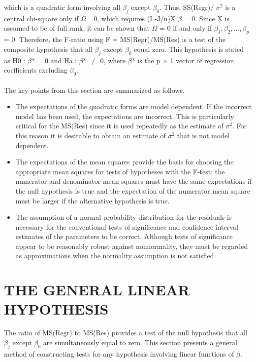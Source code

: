 \documentclass[letterpaper,11pt]{article}
\begin{document}
{which is a quadratic form involving all $\beta_{j}$ except $\beta_{0}$. Thus, SS(Regr)/ $\sigma^{2}$ is a central chi-square only if $\Omega$= 0, which requires (I -J/n)X $\beta$ = 0. Since X is assumed to be of full rank, it can be shown that $\Omega$ = 0 if and only if
$\beta_{1}, \beta_{2}, ..., \beta_{p}$ = 0. Therefore, the F-ratio using F = MS(Regr)/MS(Res) is a test of the composite hypothesis that all $\beta_{j}$ except $\beta_{0}$ equal zero. This hypothesis is stated as H0 : $\beta$* = 0 and Ha : $\beta$* $\neq$ 0,
where $\beta$* is the p $\times$ 1 vector of regression coefficients excluding $\beta_{0}$.
\\ \\
The key points from this section are summarized as follows.
\begin{itemize}
\item The expectations of the quadratic forms are model dependent. If the incorrect model has been used, the expectations are incorrect. This is particularly critical for the MS(Res) since it is used repeatedly as the estimate of $\sigma^{2}$.
For this reason it is desirable to obtain an estimate of $\sigma^{2}$ that is not model dependent. 
\item The expectations of the mean squares provide the basis for choosing the appropriate mean squares for tests of hypotheses
with the F-test; the numerator and denominator mean squares must have the same expectations if the null
hypothesis is true and the expectation of the numerator mean square must be larger if the alternative hypothesis
is true.
\item The assumption of a normal probability distribution for the residuals is necessary for the conventional tests of significance
and confidence interval estimates of the parameters to be correct. Although tests of significance appear to
be reasonably robust against nonnormality, they must be regarded as approximations when the normality assumption
is not satisfied.
\end{itemize}

\section{THE GENERAL LINEAR HYPOTHESIS}

The ratio of MS(Regr) to MS(Res) provides a test of the null hypothesis that all $\beta_{j}$ except $\beta_{0}$ are simultaneously equal to 
zero. This section presents a general method of constructing tests for any hypothesis involving linear functions of $\beta$.

}
\end{document}

